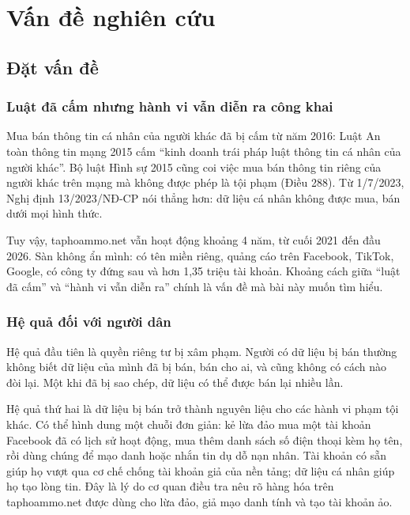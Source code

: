\section{Vấn đề nghiên cứu}\label{sec:2}

\subsection{Đặt vấn đề}\label{sec:2.1}

\subsubsection{Luật đã cấm nhưng hành vi vẫn diễn ra công khai}\label{sec:2.1.1}

Mua bán thông tin cá nhân của người khác đã bị cấm từ năm 2016: Luật An toàn thông tin mạng 2015 cấm “kinh doanh trái pháp luật thông tin cá nhân của người khác”. Bộ luật Hình sự 2015 cũng coi việc mua bán thông tin riêng của người khác trên mạng mà không được phép là tội phạm (Điều 288). Từ 1/7/2023, Nghị định 13/2023/NĐ-CP nói thẳng hơn: dữ liệu cá nhân không được mua, bán dưới mọi hình thức.

Tuy vậy, taphoammo.net vẫn hoạt động khoảng 4 năm, từ cuối 2021 đến đầu 2026. Sàn không ẩn mình: có tên miền riêng, quảng cáo trên Facebook, TikTok, Google, có công ty đứng sau và hơn 1,35 triệu tài khoản. Khoảng cách giữa “luật đã cấm” và “hành vi vẫn diễn ra” chính là vấn đề mà bài này muốn tìm hiểu.

\subsubsection{Hệ quả đối với người dân}\label{sec:2.1.2}

Hệ quả đầu tiên là quyền riêng tư bị xâm phạm. Người có dữ liệu bị bán thường không biết dữ liệu của mình đã bị bán, bán cho ai, và cũng không có cách nào đòi lại. Một khi đã bị sao chép, dữ liệu có thể được bán lại nhiều lần.

Hệ quả thứ hai là dữ liệu bị bán trở thành nguyên liệu cho các hành vi phạm tội khác. Có thể hình dung một chuỗi đơn giản: kẻ lừa đảo mua một tài khoản Facebook đã có lịch sử hoạt động, mua thêm danh sách số điện thoại kèm họ tên, rồi dùng chúng để mạo danh hoặc nhắn tin dụ dỗ nạn nhân. Tài khoản có sẵn giúp họ vượt qua cơ chế chống tài khoản giả của nền tảng; dữ liệu cá nhân giúp họ tạo lòng tin. Đây là lý do cơ quan điều tra nêu rõ hàng hóa trên taphoammo.net được dùng cho lừa đảo, giả mạo danh tính và tạo tài khoản ảo.

